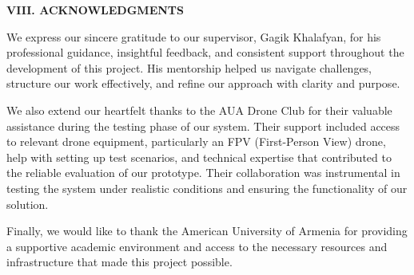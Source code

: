 \documentclass[12pt]{article}
\begin{document}
\begin{center}
{\fontsize{9}{11}\selectfont\bfseries VIII. ACKNOWLEDGMENTS}
\end{center}

\vspace{0.2em}

{\fontsize{9}{11}\selectfont
\indent We express our sincere gratitude to our supervisor, Gagik Khalafyan, for his professional guidance, insightful feedback, and consistent support throughout the development of this project. His mentorship helped us navigate challenges, structure our work effectively, and refine our approach with clarity and purpose.

We also extend our heartfelt thanks to the AUA Drone Club for their valuable assistance during the testing phase of our system. Their support included access to relevant drone equipment, particularly an FPV (First-Person View) drone, help with setting up test scenarios, and technical expertise that contributed to the reliable evaluation of our prototype. Their collaboration was instrumental in testing the system under realistic conditions and ensuring the functionality of our solution.

Finally, we would like to thank the American University of Armenia for providing a supportive academic environment and access to the necessary resources and infrastructure that made this project possible.

}

\onecolumn
\vspace{1em}

{\fontsize{7.5}{9}\selectfont


}
\end{document}
